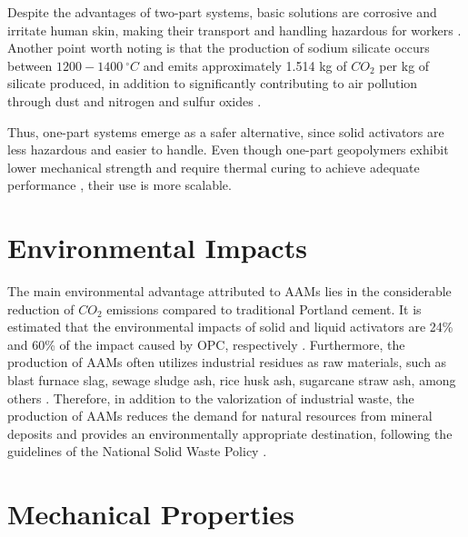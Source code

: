 Despite the advantages of two-part systems, basic solutions are corrosive and irritate human skin, making their transport and handling hazardous for workers \cite{awoyera2019critical}.
Another point worth noting is that the production of sodium silicate occurs between $1200-1400\ ^\circ C$ and emits approximately 1.514 kg of $CO_2$ per kg of silicate produced, in addition to significantly contributing to air pollution through dust and nitrogen and sulfur oxides \cite{rajan2020sustainable}.

Thus, one-part systems emerge as a safer alternative, since solid activators are less hazardous and easier to handle. Even though one-part geopolymers exhibit lower mechanical strength and require thermal curing to achieve adequate performance \cite{provis2018alkali}, their use is more scalable.

\section{Environmental Impacts}

The main environmental advantage attributed to AAMs lies in the considerable reduction of $CO_2$ emissions compared to traditional Portland cement.
It is estimated that the environmental impacts of solid and liquid activators are 24\% and 60\% of the impact caused by OPC, respectively \cite{luukkonen2017review}.
Furthermore, the production of AAMs often utilizes industrial residues as raw materials, such as blast furnace slag, sewage sludge ash, rice husk ash, sugarcane straw ash, among others \cite{moraes2024scsa}.
Therefore, in addition to the valorization of industrial waste, the production of AAMs reduces the demand for natural resources from mineral deposits and provides an environmentally appropriate destination, following the guidelines of the National Solid Waste Policy \cite{PNRS2016}.

\section{Mechanical Properties}

